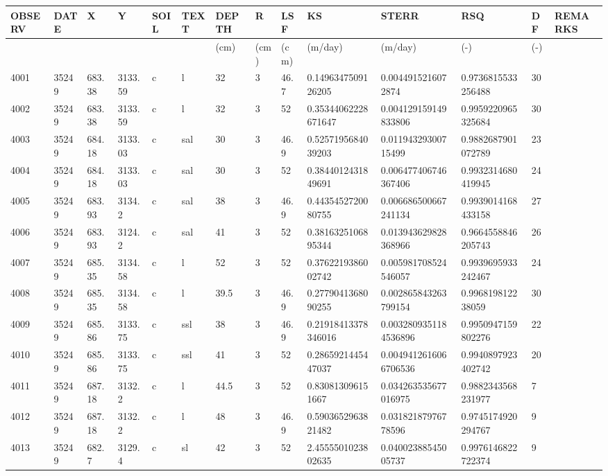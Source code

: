 \documentclass[11pt,a4paper]{article}
\begin{document}
\begin{table}[h]
\begin{tabular}{|l|l|l|l|l|l|l|l|l|l|l|l|l|l|}
\hline
OBSERV & DATE & X & Y & SOIL & TEXT & DEPTH & R & LSF & KS & STERR & RSQ & DF & REMARKS \\ \hline
 &  &  &  &  &  & (cm) & (cm) & (cm) & (m/day) & (m/day) & (-) & (-) &  \\ \hline
4001 & 35249 & 683.38 & 3133.59 & c & l & 32 & 3 & 46.7 & 0.1496347509126205 & 0.0044915216072874 & 0.9736815533256488 & 30 &  \\ \hline
4002 & 35249 & 683.38 & 3133.59 & c & l & 32 & 3 & 52 & 0.35344062228671647 & 0.004129159149833806 & 0.9959220965325684 & 30 &  \\ \hline
4003 & 35249 & 684.18 & 3133.03 & c & sal & 30 & 3 & 46.9 & 0.5257195684039203 & 0.01194329300715499 & 0.9882687901072789 & 23 &  \\ \hline
4004 & 35249 & 684.18 & 3133.03 & c & sal & 30 & 3 & 52 & 0.3844012431849691 & 0.006477406746367406 & 0.9932314680419945 & 24 &  \\ \hline
4005 & 35249 & 683.93 & 3134.2 & c & sal & 38 & 3 & 46.9 & 0.4435452720080755 & 0.006686500667241134 & 0.9939014168433158 & 27 &  \\ \hline
4006 & 35249 & 683.93 & 3124.2 & c & sal & 41 & 3 & 52 & 0.3816325106895344 & 0.013943629828368966 & 0.9664558846205743 & 26 &  \\ \hline
4007 & 35249 & 685.35 & 3134.58 & c & l & 52 & 3 & 52 & 0.3762219386002742 & 0.005981708524546057 & 0.9939695933242467 & 24 &  \\ \hline
4008 & 35249 & 685.35 & 3134.58 & c & l & 39.5 & 3 & 46.9 & 0.2779041368090255 & 0.002865843263799154 & 0.996819812238059 & 30 &  \\ \hline
4009 & 35249 & 685.86 & 3133.75 & c & ssl & 38 & 3 & 46.9 & 0.21918413378346016 & 0.0032809351184536896 & 0.9950947159802276 & 22 &  \\ \hline
4010 & 35249 & 685.86 & 3133.75 & c & ssl & 41 & 3 & 52 & 0.2865921445447037 & 0.0049412616066706536 & 0.9940897923402742 & 20 &  \\ \hline
4011 & 35249 & 687.18 & 3132.2 & c & l & 44.5 & 3 & 52 & 0.830813096151667 & 0.034263535677016975 & 0.9882343568231977 & 7 &  \\ \hline
4012 & 35249 & 687.18 & 3132.2 & c & l & 48 & 3 & 46.9 & 0.5903652963821482 & 0.03182187976778596 & 0.9745174920294767 & 9 &  \\ \hline
4013 & 35249 & 682.7 & 3129.4 & c & sl & 42 & 3 & 52 & 2.4555501023802635 & 0.04002388545005737 & 0.9976146822722374 & 9 &  \\ \hline

\end{tabular}
\end{table}
\end{document}
